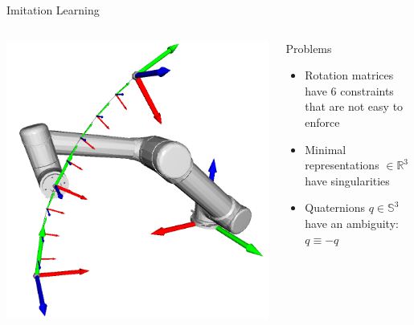 \documentclass[14pt,aspectratio=169]{beamer}
\begin{document}
\begin{frame}[fragile]{Imitation Learning}
\begin{columns}
\begin{column}{0.3\textwidth}
\includegraphics[width=\textwidth]{images/movement_primitives_cart_dmp_ur5}
\end{column}
\begin{column}{0.7\textwidth}
Problems
\begin{itemize}
\item Rotation matrices have 6 constraints that are not easy to enforce
\item Minimal representations $\in \mathbb{R}^3$ have singularities
\item Quaternions $q \in \mathbb{S}^3$ have an ambiguity: $q \equiv -q$
\end{itemize}
\end{column}
\end{columns}
\end{frame}
\end{document}
